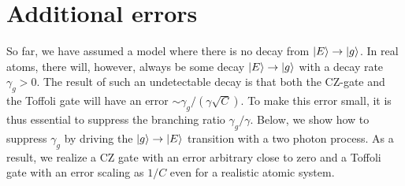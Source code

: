 \section{Additional errors}

So far, we have assumed a model where there is no decay from
$| E \rangle\to| g \rangle$. In real atoms, there will, however, always be some decay
$| E \rangle\to| g \rangle$ with a decay rate $\gamma_{g}>0$. The result of such an
undetectable decay is that both the CZ-gate and the Toffoli gate will have an
error $\sim \gamma_{g}/(\gamma\sqrt{C})$. To make this error small, it is thus essential to suppress the
branching ratio $\gamma_{g}/\gamma$. Below, we show how to suppress $\gamma_{g}$
by driving the $| g \rangle\to| E \rangle$ transition with a two photon process. As a result, we realize a CZ gate with an
error arbitrary close to zero and a Toffoli gate with an error scaling  as $1/C$
even for a realistic atomic system.

